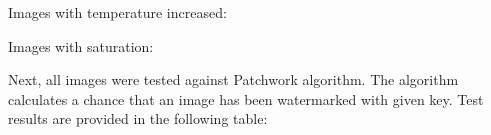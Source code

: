 \documentclass[a4paper, 12pt]{article}
\begin{document}
    Images with temperature increased:
    
    \begin{figure}[H]
        \centering
        \qquad
        \label{}
    \end{figure}
    
    \newpage
    Images with saturation:
    
    \begin{figure}[H]
        \centering
        \qquad
        \label{}
    \end{figure}

    Next, all images were tested against Patchwork algorithm. The algorithm calculates a chance that an image has been watermarked with given key. Test results are provided in the following table:
    
\end{document}
